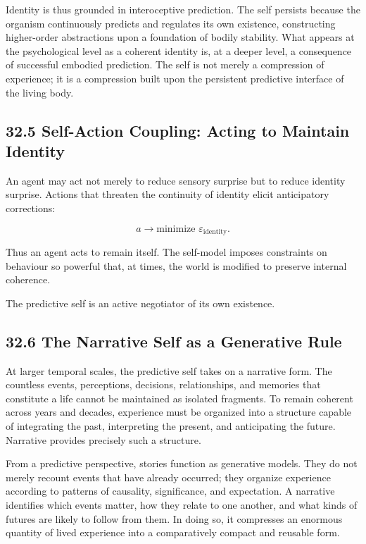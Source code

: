 \documentclass[12pt,letterpaper]{article}
\theoremstyle{remark}
\begin{document}
Identity is thus grounded in interoceptive prediction. The self persists because the organism continuously predicts and regulates its own existence, constructing higher-order abstractions upon a foundation of bodily stability. What appears at the psychological level as a coherent identity is, at a deeper level, a consequence of successful embodied prediction. The self is not merely a compression of experience; it is a compression built upon the persistent predictive interface of the living body.

\subsection{32.5 Self-Action Coupling: Acting to Maintain Identity}

An agent may act not merely to reduce sensory surprise but to reduce identity surprise.  
Actions that threaten the continuity of identity elicit anticipatory corrections:

\[
a \to \text{minimize } \varepsilon_{\text{identity}}.
\]

Thus an agent acts to remain itself.  
The self-model imposes constraints on behaviour so powerful that, at times, the world is modified to preserve internal coherence.  

The predictive self is an active negotiator of its own existence.

\subsection{32.6 The Narrative Self as a Generative Rule}

At larger temporal scales, the predictive self takes on a narrative form. The countless events, perceptions, decisions, relationships, and memories that constitute a life cannot be maintained as isolated fragments. To remain coherent across years and decades, experience must be organized into a structure capable of integrating the past, interpreting the present, and anticipating the future. Narrative provides precisely such a structure.

From a predictive perspective, stories function as generative models. They do not merely recount events that have already occurred; they organize experience according to patterns of causality, significance, and expectation. A narrative identifies which events matter, how they relate to one another, and what kinds of futures are likely to follow from them. In doing so, it compresses an enormous quantity of lived experience into a comparatively compact and reusable form.
\end{document}
